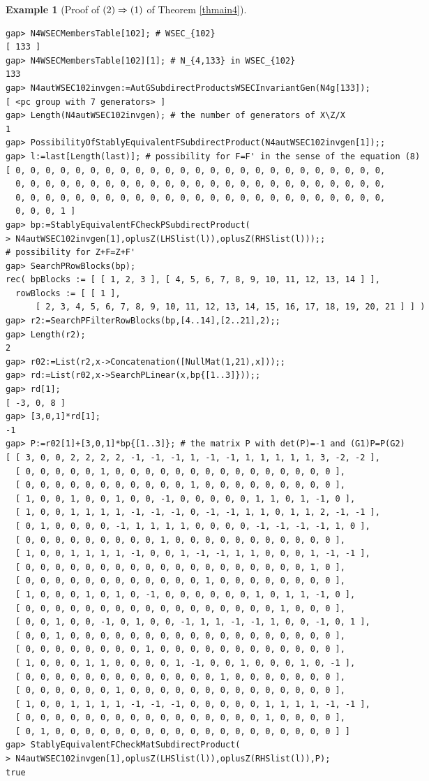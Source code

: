 \documentclass{amsart}
\theoremstyle{plain}
\theoremstyle{definition}
\newtheorem{example}[theorem]{Example}
\theoremstyle{remark}
\begin{document}
\begin{example}[Proof of ${\rm (2)}\Rightarrow {\rm (1)}$ of {Theorem \ref{thmain4}}]
\begin{verbatim}
gap> N4WSECMembersTable[102]; # WSEC_{102}
[ 133 ]
gap> N4WSECMembersTable[102][1]; # N_{4,133} in WSEC_{102}
133
gap> N4autWSEC102invgen:=AutGSubdirectProductsWSECInvariantGen(N4g[133]);
[ <pc group with 7 generators> ]
gap> Length(N4autWSEC102invgen); # the number of generators of X\Z/X
1
gap> PossibilityOfStablyEquivalentFSubdirectProduct(N4autWSEC102invgen[1]);;
gap> l:=last[Length(last)]; # possibility for F=F' in the sense of the equation (8)
[ 0, 0, 0, 0, 0, 0, 0, 0, 0, 0, 0, 0, 0, 0, 0, 0, 0, 0, 0, 0, 0, 0, 0, 0, 0, 
  0, 0, 0, 0, 0, 0, 0, 0, 0, 0, 0, 0, 0, 0, 0, 0, 0, 0, 0, 0, 0, 0, 0, 0, 0, 
  0, 0, 0, 0, 0, 0, 0, 0, 0, 0, 0, 0, 0, 0, 0, 0, 0, 0, 0, 0, 0, 0, 0, 0, 0, 
  0, 0, 0, 1 ]
gap> bp:=StablyEquivalentFCheckPSubdirectProduct(
> N4autWSEC102invgen[1],oplusZ(LHSlist(l)),oplusZ(RHSlist(l)));;
# possibility for Z+F=Z+F'
gap> SearchPRowBlocks(bp);
rec( bpBlocks := [ [ 1, 2, 3 ], [ 4, 5, 6, 7, 8, 9, 10, 11, 12, 13, 14 ] ], 
  rowBlocks := [ [ 1 ], 
      [ 2, 3, 4, 5, 6, 7, 8, 9, 10, 11, 12, 13, 14, 15, 16, 17, 18, 19, 20, 21 ] ] )
gap> r2:=SearchPFilterRowBlocks(bp,[4..14],[2..21],2);;
gap> Length(r2);
2
gap> r02:=List(r2,x->Concatenation([NullMat(1,21),x]));;
gap> rd:=List(r02,x->SearchPLinear(x,bp{[1..3]}));;
gap> rd[1];
[ -3, 0, 8 ]
gap> [3,0,1]*rd[1];
-1
gap> P:=r02[1]+[3,0,1]*bp{[1..3]}; # the matrix P with det(P)=-1 and (G1)P=P(G2)
[ [ 3, 0, 0, 2, 2, 2, 2, -1, -1, -1, 1, -1, -1, 1, 1, 1, 1, 1, 3, -2, -2 ], 
  [ 0, 0, 0, 0, 0, 1, 0, 0, 0, 0, 0, 0, 0, 0, 0, 0, 0, 0, 0, 0, 0 ], 
  [ 0, 0, 0, 0, 0, 0, 0, 0, 0, 0, 0, 1, 0, 0, 0, 0, 0, 0, 0, 0, 0 ], 
  [ 1, 0, 0, 1, 0, 0, 1, 0, 0, -1, 0, 0, 0, 0, 0, 1, 1, 0, 1, -1, 0 ], 
  [ 1, 0, 0, 1, 1, 1, 1, -1, -1, -1, 0, -1, -1, 1, 1, 0, 1, 1, 2, -1, -1 ], 
  [ 0, 1, 0, 0, 0, 0, -1, 1, 1, 1, 1, 0, 0, 0, 0, -1, -1, -1, -1, 1, 0 ], 
  [ 0, 0, 0, 0, 0, 0, 0, 0, 0, 1, 0, 0, 0, 0, 0, 0, 0, 0, 0, 0, 0 ], 
  [ 1, 0, 0, 1, 1, 1, 1, -1, 0, 0, 1, -1, -1, 1, 1, 0, 0, 0, 1, -1, -1 ], 
  [ 0, 0, 0, 0, 0, 0, 0, 0, 0, 0, 0, 0, 0, 0, 0, 0, 0, 0, 0, 1, 0 ], 
  [ 0, 0, 0, 0, 0, 0, 0, 0, 0, 0, 0, 0, 1, 0, 0, 0, 0, 0, 0, 0, 0 ], 
  [ 1, 0, 0, 0, 1, 0, 1, 0, -1, 0, 0, 0, 0, 0, 0, 1, 0, 1, 1, -1, 0 ], 
  [ 0, 0, 0, 0, 0, 0, 0, 0, 0, 0, 0, 0, 0, 0, 0, 0, 0, 1, 0, 0, 0 ], 
  [ 0, 0, 1, 0, 0, -1, 0, 1, 0, 0, -1, 1, 1, -1, -1, 1, 0, 0, -1, 0, 1 ], 
  [ 0, 0, 1, 0, 0, 0, 0, 0, 0, 0, 0, 0, 0, 0, 0, 0, 0, 0, 0, 0, 0 ], 
  [ 0, 0, 0, 0, 0, 0, 0, 0, 1, 0, 0, 0, 0, 0, 0, 0, 0, 0, 0, 0, 0 ], 
  [ 1, 0, 0, 0, 1, 1, 0, 0, 0, 0, 1, -1, 0, 0, 1, 0, 0, 0, 1, 0, -1 ], 
  [ 0, 0, 0, 0, 0, 0, 0, 0, 0, 0, 0, 0, 0, 1, 0, 0, 0, 0, 0, 0, 0 ], 
  [ 0, 0, 0, 0, 0, 0, 1, 0, 0, 0, 0, 0, 0, 0, 0, 0, 0, 0, 0, 0, 0 ], 
  [ 1, 0, 0, 1, 1, 1, 1, -1, -1, -1, 0, 0, 0, 0, 0, 1, 1, 1, 1, -1, -1 ], 
  [ 0, 0, 0, 0, 0, 0, 0, 0, 0, 0, 0, 0, 0, 0, 0, 0, 1, 0, 0, 0, 0 ], 
  [ 0, 1, 0, 0, 0, 0, 0, 0, 0, 0, 0, 0, 0, 0, 0, 0, 0, 0, 0, 0, 0 ] ]
gap> StablyEquivalentFCheckMatSubdirectProduct(
> N4autWSEC102invgen[1],oplusZ(LHSlist(l)),oplusZ(RHSlist(l)),P);
true


\end{verbatim}
\end{example}
\end{document}
